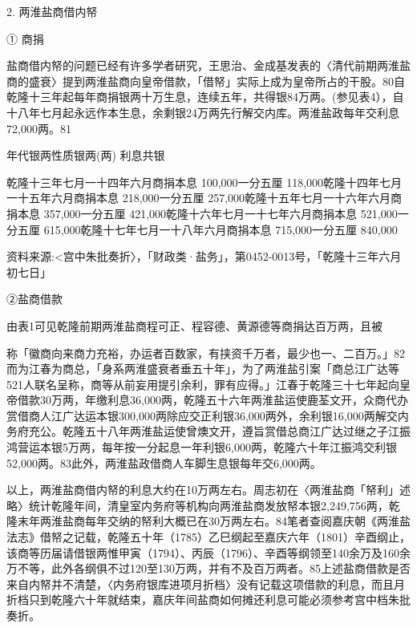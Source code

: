 2. 两淮盐商借内帑

① 商捐

盐商借内帑的问题已经有许多学者研究，王思治、金成基发表的〈清代前期两淮盐商的盛衰〉提到两淮盐商向皇帝借款，「借帑」实际上成为皇帝所占的干股。80自乾隆十三年起每年商捐银两十万生息，连续五年，共得银84万两。(参见表4），自十八年七月起永远作本生息，余剩银24万两先行解交内库。两淮盐政每年交利息72,000两。81

\begin{BookQuote}
年代银两性质银两(两) 利息共银
\end{BookQuote}

乾隆十三年七月一十四年六月商捐本息 100,000一分五厘 118,000乾隆十四年七月一十五年六月商捐本息 218,000一分五厘 257,000乾隆十五年七月一十六年六月商捐本息 357,000一分五厘 421,000乾隆十六年七月一十七年六月商捐本息 521,000一分五厘 615,000乾隆十七年七月一十八年六月商捐本息 715,000一分五厘 840,000

\begin{BookQuote}
资料来源:<宫中朱批奏折〉，「财政类·盐务」，第0452-0013号，「乾隆十三年六月初七日」
\end{BookQuote}

②盐商借款

由表1可见乾隆前期两淮盐商程可正、程容德、黄源德等商捐达百万两，且被

\vfill
\begin{BookNotes}
\end{BookNotes}

\noindent 称「徽商向来商力充裕，办运者百数家，有挟资千万者，最少也一、二百万。」82而为江春为商总，「身系两淮盛衰者垂五十年」，为了两淮盐引案「商总江广达等521人联名呈称，商等从前妄用提引余利，罪有应得。」江春于乾隆三十七年起向皇帝借款30万两，年缴利息36,000两，乾隆五十六年两淮盐运使鹿荃文开，众商代办赏借商人江广达运本银300,000两除应交正利银36,000两外，余利银16,000两解交内务府充公。乾隆五十八年两淮盐运使曾燠文开，遵旨赏借总商江广达过继之子江振鸿营运本银5万两，每年按一分起息一年利银6,000两，乾隆六十年江振鸿交利银52,000两。83此外，两淮盐政借商人车脚生息银每年交6,000两。

以上，两淮盐商借内帑的利息大约在10万两左右。周志初在〈两淮盐商「帑利」述略〉统计乾隆年间，清皇室内务府等机构向两淮盐商发放帑本银2,249,756两，乾隆末年两淮盐商每年交纳的帑利大概已在30万两左右。84笔者查阅嘉庆朝《两淮盐法志》借帑之记载，乾隆五十年（1785）乙巳纲起至嘉庆六年（1801）辛酉纲止，该商等历届请借银两惟甲寅（1794）、丙辰（1796）、辛酉等纲领至140余万及160余万不等，此外各纲俱不过120至130万两，并有不及百万两者。85上述盐商借款是否来自内帑并不清楚，〈内务府银库进项月折档〉没有记载这项借款的利息，而且月折档只到乾隆六十年就结束，嘉庆年间盐商如何摊还利息可能必须参考宫中档朱批奏折。

